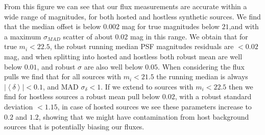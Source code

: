 %
From this figure we can see that our \gls{flux} measurements are accurate within a wide range of magnitudes, for both hosted and hostless synthetic sources. We find that the median offset is below $0.002$ mag for true magnitudes below $21$,and with a maximum $\sigma_{MAD}$ scatter of about $0.02$ mag in this range. We obtain that for true $m_i < 22.5$, the robust running median PSF magnitudes residuals are $<0.02$ mag, and when splitting into hosted and hostless both robust mean are well below $0.01$, and robust $\sigma$ are also well below $0.05$.
%
When considering the \gls{flux} pulls we find that for all sources with $m_i<21.5$ the running median is always $|\left<\delta\right>| <0.1$, and MAD $\sigma_\delta < 1$. If we extend to sources with $m_i<22.5$ then we find for hostless sources a robust mean pull below $0.02$, with a robust standard deviation $<1.15$, in case of hosted sources we see these parameters increase to $0.2$ and $1.2$, showing that we might have contamination from host background sources that is potentially biasing our fluxes.
%
